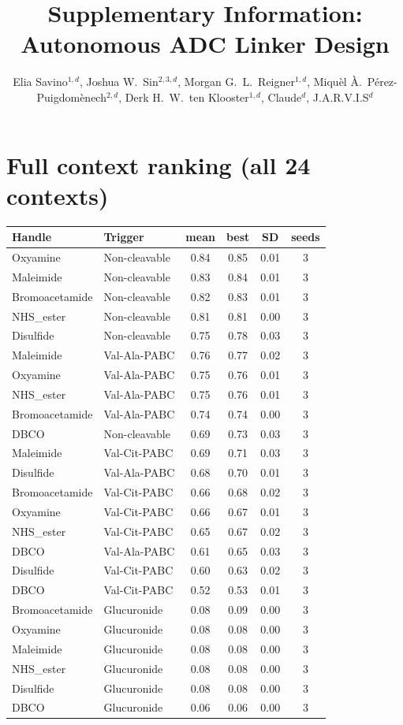 \documentclass[10pt]{article}
\title{\textbf{Supplementary Information: Autonomous ADC Linker Design}}
\author{Elia Savino$^{1,d}$, Joshua W.\ Sin$^{2,3,d}$, Morgan G.\ L.\ Reigner$^{1,d}$, Miqu\`el \`A.\ P\'erez-Puigdom\`enech$^{2,d}$, Derk H.\ W.\ ten Klooster$^{1,d}$, Claude$^{d}$, J.A.R.V.I.S$^{d}$}
\date{}
\begin{document}
\maketitle
\section{Full context ranking (all 24 contexts)}
\begin{longtable}{l l c c c c}\toprule
Handle & Trigger & mean & best & SD & seeds \\ \midrule\endhead
Oxyamine & Non-cleavable & 0.84 & 0.85 & 0.01 & 3 \\
Maleimide & Non-cleavable & 0.83 & 0.84 & 0.01 & 3 \\
Bromoacetamide & Non-cleavable & 0.82 & 0.83 & 0.01 & 3 \\
NHS\_ester & Non-cleavable & 0.81 & 0.81 & 0.00 & 3 \\
Disulfide & Non-cleavable & 0.75 & 0.78 & 0.03 & 3 \\
Maleimide & Val-Ala-PABC & 0.76 & 0.77 & 0.02 & 3 \\
Oxyamine & Val-Ala-PABC & 0.75 & 0.76 & 0.01 & 3 \\
NHS\_ester & Val-Ala-PABC & 0.75 & 0.76 & 0.01 & 3 \\
Bromoacetamide & Val-Ala-PABC & 0.74 & 0.74 & 0.00 & 3 \\
DBCO & Non-cleavable & 0.69 & 0.73 & 0.03 & 3 \\
Maleimide & Val-Cit-PABC & 0.69 & 0.71 & 0.03 & 3 \\
Disulfide & Val-Ala-PABC & 0.68 & 0.70 & 0.01 & 3 \\
Bromoacetamide & Val-Cit-PABC & 0.66 & 0.68 & 0.02 & 3 \\
Oxyamine & Val-Cit-PABC & 0.66 & 0.67 & 0.01 & 3 \\
NHS\_ester & Val-Cit-PABC & 0.65 & 0.67 & 0.02 & 3 \\
DBCO & Val-Ala-PABC & 0.61 & 0.65 & 0.03 & 3 \\
Disulfide & Val-Cit-PABC & 0.60 & 0.63 & 0.02 & 3 \\
DBCO & Val-Cit-PABC & 0.52 & 0.53 & 0.01 & 3 \\
Bromoacetamide & Glucuronide & 0.08 & 0.09 & 0.00 & 3 \\
Oxyamine & Glucuronide & 0.08 & 0.08 & 0.00 & 3 \\
Maleimide & Glucuronide & 0.08 & 0.08 & 0.00 & 3 \\
NHS\_ester & Glucuronide & 0.08 & 0.08 & 0.00 & 3 \\
Disulfide & Glucuronide & 0.08 & 0.08 & 0.00 & 3 \\
DBCO & Glucuronide & 0.06 & 0.06 & 0.00 & 3 \\
\bottomrule\end{longtable}
\end{document}
